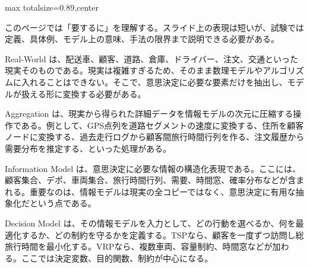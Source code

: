 \begin{minipage}[t]{0.58\textwidth}
\begin{adjustbox}{max totalsize={\textwidth}{0.89\textheight},center}
\begin{minipage}{\textwidth}\scriptsize
{}このページでは「要するに」を理解する。スライド上の表現は短いが、試験では定義、具体例、モデル上の意味、手法の限界まで説明できる必要がある。\par
Real-World は、配送車、顧客、道路、倉庫、ドライバー、注文、交通といった現実そのものである。現実は複雑すぎるため、そのまま数理モデルやアルゴリズムに入れることはできない。そこで、意思決定に必要な要素だけを抽出し、モデルが扱える形に変換する必要がある。\par
Aggregation は、現実から得られた詳細データを情報モデルの次元に圧縮する操作である。例として、GPS点列を道路セグメントの速度に変換する、住所を顧客ノードに変換する、過去走行ログから顧客間旅行時間行列を作る、注文履歴から需要分布を推定する、といった処理がある。\par
Information Model は、意思決定に必要な情報の構造化表現である。ここには、顧客集合、デポ、車両集合、旅行時間行列、需要、時間窓、確率分布などが含まれる。重要なのは、情報モデルは現実の全コピーではなく、意思決定に有用な抽象化だという点である。\par
Decision Model は、その情報モデルを入力として、どの行動を選べるか、何を最適化するか、どの制約を守るかを定義する。TSPなら、顧客を一度ずつ訪問し総旅行時間を最小化する。VRPなら、複数車両、容量制約、時間窓などが加わる。ここでは決定変数、目的関数、制約が中心になる。\par

\end{minipage}
\end{adjustbox}
\end{minipage}
